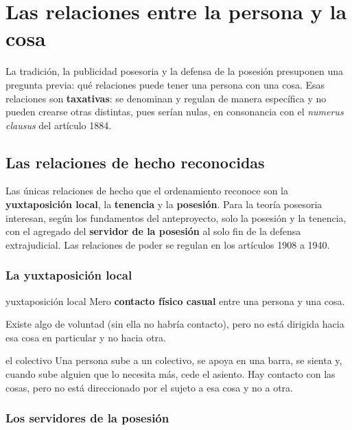 \documentclass[12pt,oneside]{book}
\begin{document}
\chapter[Las relaciones entre la persona y la cosa]{Las relaciones entre la persona y la cosa}\label{cap:poder}

La tradición, la publicidad posesoria y la defensa de la posesión presuponen una pregunta previa: qué relaciones puede tener una persona con una cosa. Esas relaciones son \textbf{taxativas}: se denominan y regulan de manera específica y no pueden crearse otras distintas, pues serían nulas, en consonancia con el \textit{numerus clausus} del artículo 1884.

\section{Las relaciones de hecho reconocidas}

Las únicas relaciones de hecho que el ordenamiento reconoce son la \textbf{yuxtaposición local}, la \textbf{tenencia} y la \textbf{posesión}. Para la teoría posesoria interesan, según los fundamentos del anteproyecto, solo la posesión y la tenencia, con el agregado del \textbf{servidor de la posesión} al solo fin de la defensa extrajudicial. Las relaciones de poder se regulan en los artículos 1908 a 1940.

\subsection{La yuxtaposición local}

\begin{definicion}{yuxtaposición local}
Mero \textbf{contacto físico casual} entre una persona y una cosa.
\end{definicion}

Existe algo de voluntad (sin ella no habría contacto), pero no está dirigida hacia esa cosa en particular y no hacia otra.

\begin{ejemplo}{el colectivo}
Una persona sube a un colectivo, se apoya en una barra, se sienta y, cuando sube alguien que lo necesita más, cede el asiento. Hay contacto con las cosas, pero no está direccionado por el sujeto a esa cosa y no a otra.
\end{ejemplo}

\subsection{Los servidores de la posesión}
\end{document}
